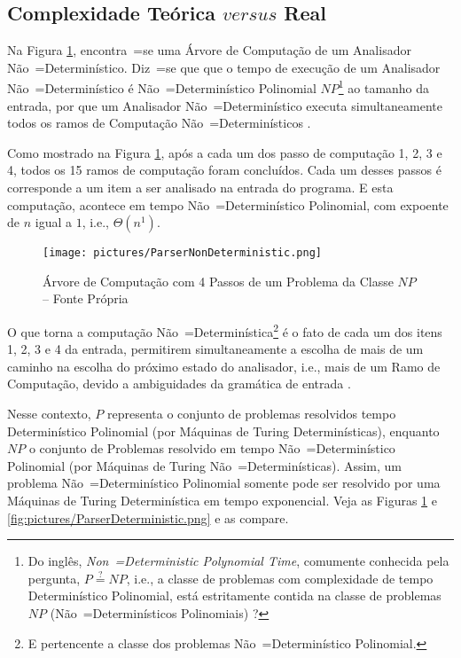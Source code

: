 {\subsection{Complexidade Teórica $versus$ Real}

    Na Figura \ref{fig:pictures/ParserNonDeterministic.png},
    encontra~=se uma Árvore de Computação de um Analisador Não~=Determinístico.
    Diz~=se que que o tempo de execução de um Analisador Não~=Determinístico é Não~=Determinístico Polinomial $NP$\footnote{
    Do inglês, \textit{Non~=Deterministic Polynomial Time},
    comumente conhecida pela pergunta,
    $P \stackrel{?}{=} NP$, i.e.,
    a classe de problemas com complexidade de tempo Determinístico Polinomial,
    está estritamente contida na classe de problemas $NP$ (Não~=Determinísticos Polinomiais) \cite{computationalComplexityAuroraBarak}?
    }
    ao tamanho da entrada,
    por que um Analisador Não~=Determinístico executa simultaneamente todos os ramos de Computação Não~=Determinísticos \cite{hopcroftBook}.

    Como mostrado na Figura \ref{fig:pictures/ParserNonDeterministic.png},
    após a cada um dos passo de computação 1,
    2, 3 e 4,
    todos os 15 ramos de computação foram concluídos.
    Cada um desses passos é corresponde a um item a ser analisado na entrada do programa.
    E esta computação,
    acontece em tempo Não~=Determinístico Polinomial,
    com expoente de $n$ igual a $1$,
    i.e.,
    $\Theta(n^1)$.
    \begin{figure}[h]
    \centering
    \texttt{[image: pictures/ParserNonDeterministic.png]}
    \caption[Árvore de Computação com 4 Passos de um Problema da Classe $NP$]{Árvore de Computação com 4 Passos de um Problema da Classe $NP$ -- Fonte Própria}
    \label{fig:pictures/ParserNonDeterministic.png}
    \end{figure}

    O que torna a computação Não~=Determinística\footnote{
    E pertencente a classe dos problemas Não~=Determinístico Polinomial.
    } é o fato de cada um dos itens 1,
    2, 3 e 4 da entrada,
    permitirem simultaneamente a escolha de mais de um caminho na escolha do próximo estado do analisador,
    i.e.,
    mais de um Ramo de Computação,
    devido a ambiguidades da gramática de entrada \cite{antlrBookTerrentParr}.

    Nesse contexto,
    $P$ representa o conjunto de problemas resolvidos tempo Determinístico Polinomial (por Máquinas de Turing Determinísticas),
    enquanto $NP$ o conjunto de Problemas resolvido em tempo Não~=Determinístico Polinomial (por Máquinas de Turing Não~=Determinísticas).
    Assim,
    um problema Não~=Determinístico Polinomial somente pode ser resolvido por uma Máquinas de Turing Determinística em tempo exponencial.
    Veja as Figuras \ref{fig:pictures/ParserNonDeterministic.png} e
    \ref{fig:pictures/ParserDeterministic.png} e
    as compare.

}
